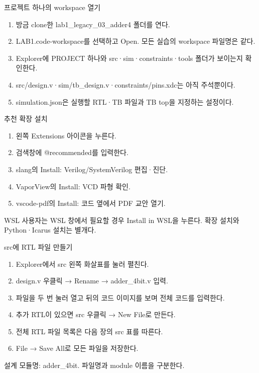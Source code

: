 \begin{frame}{프로젝트 하나의 workspace 열기}\relax
\small
\begin{enumerate}\setlength{\itemsep}{0.22cm}
\item 방금 clone한 lab1\_legacy\_03\_adder4 폴더를 연다.
\item LAB1.code-workspace를 선택하고 Open. 모든 실습의 workspace 파일명은 같다.
\item Explorer에 PROJECT 하나와 src·sim·constraints·tools 폴더가 보이는지 확인한다.
\item src/design.v·sim/tb\_design.v·constraints/pins.xdc는 아직 주석뿐이다.
\item simulation.json은 실행할 RTL·TB 파일과 TB top을 지정하는 설정이다.
\end{enumerate}

\end{frame}

\begin{frame}{추천 확장 설치}\relax
\small
\begin{enumerate}\setlength{\itemsep}{0.22cm}
\item 왼쪽 Extensions 아이콘을 누른다.
\item 검색창에 @recommended를 입력한다.
\item slang의 Install: Verilog/SystemVerilog 편집·진단.
\item VaporView의 Install: VCD 파형 확인.
\item vscode-pdf의 Install: 코드 옆에서 PDF 교안 열기.
\end{enumerate}
WSL 사용자는 WSL 창에서 필요할 경우 Install in WSL을 누른다. 확장 설치와 Python·Icarus 설치는 별개다.\par
\end{frame}

\begin{frame}{src에 RTL 파일 만들기}\relax
\small
\begin{enumerate}\setlength{\itemsep}{0.22cm}
\item Explorer에서 src 왼쪽 화살표를 눌러 펼친다.
\item design.v 우클릭 → Rename → adder\_4bit.v 입력.
\item 파일을 두 번 눌러 열고 뒤의 코드 이미지를 보며 전체 코드를 입력한다.
\item 추가 RTL이 있으면 src 우클릭 → New File로 만든다.
\item 전체 RTL 파일 목록은 다음 장의 src 표를 따른다.
\item File → Save All로 모든 파일을 저장한다.
\end{enumerate}
설계 모듈명: adder\_4bit. 파일명과 module 이름을 구분한다.\par
\end{frame}

